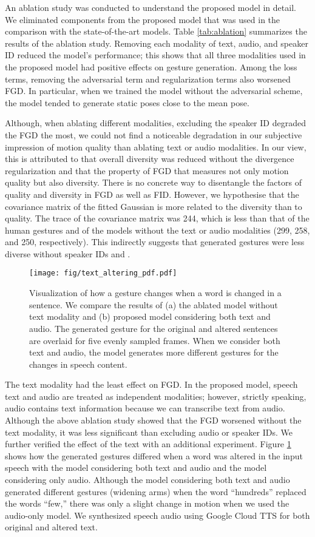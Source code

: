 \documentclass[acmtog]{acmart}
\begin{document}
An ablation study was conducted to understand the proposed model in detail. We eliminated components from the proposed model that was used in the comparison with the state-of-the-art models. Table \ref{tab:ablation} summarizes the results of the ablation study. Removing each modality of text, audio, and speaker ID reduced the model's performance; this shows that all three modalities used in the proposed model had positive effects on gesture generation. Among the loss terms, removing the adversarial term and regularization terms also worsened FGD. In particular, when we trained the model without the adversarial scheme, the model tended to generate static poses close to the mean pose.

Although, when ablating different modalities, excluding the speaker ID degraded the FGD the most, we could not find a noticeable degradation in our subjective impression of motion quality than ablating text or audio modalities. In our view, this is attributed to that overall diversity was reduced without the divergence regularization  and that the property of FGD that measures not only motion quality but also diversity. There is no concrete way to disentangle the factors of quality and diversity in FGD as well as FID. However, we hypothesise that the covariance matrix of the fitted Gaussian is more related to the diversity than to quality. The trace of the covariance matrix was 244, which is less than that of the human gestures and of the models without the text or audio modalities (299, 258, and 250, respectively). This indirectly suggests that generated gestures were less diverse without speaker IDs and .


\begin{figure}
  \centering
  \texttt{[image: fig/text\_altering\_pdf.pdf]}
  \caption{Visualization of how a gesture changes when a word is changed in a sentence. We compare the results of (a) the ablated model without text modality and (b) proposed model considering both text and audio. The generated gesture for the original and altered sentences are overlaid for five evenly sampled frames. When we consider both text and audio, the model generates more different gestures for the changes in speech content.}
  \label{fig:text_altering}
\end{figure} 
The text modality had the least effect on FGD. In the proposed model, speech text and audio are treated as independent modalities; however, strictly speaking, audio contains text information because we can transcribe text from audio. Although the above ablation study showed that the FGD worsened without the text modality, it was less significant than excluding audio or speaker IDs. We further verified the effect of the text with an additional experiment. Figure \ref{fig:text_altering} shows how the generated gestures differed when a word was altered in the input speech with the model considering both text and audio and the model considering only audio. Although the model considering both text and audio generated different gestures (widening arms) when the word ``hundreds'' replaced the words ``few,'' there was only a slight change in motion when we used the audio-only model. We synthesized speech audio using Google Cloud TTS \cite{googletts} for both original and altered text.
\end{document}
